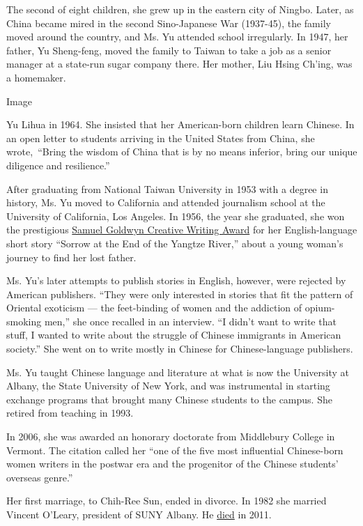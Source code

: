 The second of eight children, she grew up in the eastern city of Ningbo.
Later, as China became mired in the second Sino-Japanese War (1937-45),
the family moved around the country, and Ms. Yu attended school
irregularly. In 1947, her father, Yu Sheng-feng, moved the family to
Taiwan to take a job as a senior manager at a state-run sugar company
there. Her mother, Liu Hsing Ch'ing, was a homemaker.

Image

Yu Lihua in 1964. She insisted that her American-born children learn
Chinese. In an open letter to students arriving in the United States
from China, she wrote,~``Bring the wisdom of China that is by no means
inferior, bring our unique diligence and resilience.''

After graduating from National Taiwan University in 1953 with a degree
in history, Ms. Yu moved to California and attended journalism school at
the University of California, Los Angeles. In 1956, the year she
graduated, she won the prestigious
\href{https://timesmachine.nytimes3xbfgragh.onion/timesmachine/1956/06/01/86601140.pdf?pdf_redirect=true\&ip=0}{Samuel
Goldwyn Creative Writing Award} for her English-language short story
``Sorrow at the End of the Yangtze River,'' about a young woman's
journey to find her lost father.

Ms. Yu's later attempts to publish stories in English, however, were
rejected by American publishers. ``They were only interested in stories
that fit the pattern of Oriental exoticism --- the feet-binding of women
and the addiction of opium-smoking men,'' she once recalled in an
interview. ``I didn't want to write that stuff, I wanted to write about
the struggle of Chinese immigrants in American society.'' She went on to
write mostly in Chinese for Chinese-language publishers.

Ms. Yu taught Chinese language and literature at what is now the
University at Albany, the State University of New York, and was
instrumental in starting exchange programs that brought many Chinese
students to the campus. She retired from teaching in 1993.

In 2006, she was awarded an honorary doctorate from Middlebury College
in Vermont. The citation called her ``one of the five most influential
Chinese-born women writers in the postwar era and the progenitor of the
Chinese students' overseas genre.''

Her first marriage, to Chih-Ree Sun, ended in divorce. In 1982 she
married Vincent O'Leary, president of SUNY Albany. He
\href{https://archive.nytimes3xbfgragh.onion/query.nytimes3xbfgragh.onion/gst/fullpage-980DEEDF1E3BF931A35756C0A9679D8B63.html}{died}
in 2011.

